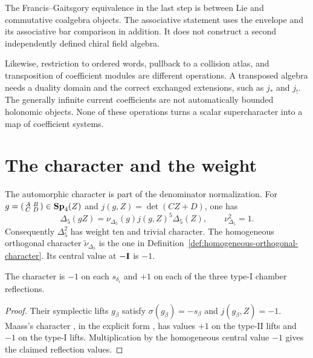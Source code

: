 The Francis--Gaitsgory equivalence in the last step is between Lie
and commutative coalgebra objects. The associative statement uses
the envelope and its associative bar comparison in addition.
It does not construct a second independently defined chiral field
algebra.

Likewise, restriction to ordered words, pullback to a
collision atlas, and transposition of coefficient modules are
different operations. A transposed algebra needs a duality domain
and the correct exchanged extensions, such as $j_*$ and $j_!$.
The generally infinite current coefficients are not automatically
bounded holonomic objects. None of these operations turns a scalar
supercharacter into a map of coefficient systems.

\section{The character and the weight}
\label{sec:bkm-maass-multiplier}

The automorphic character is part of the denominator normalization.
For $g=\left(\begin{smallmatrix}A&B\\C&D\end{smallmatrix}\right)
\in\mathbf{Sp}_4(Z)$ and $j(g,Z)=\det(CZ+D)$, one has
\begin{equation}
\label{eq:bkm-delta5-transformation}
 \Delta_5(gZ)=\nu_{\Delta_5}(g)j(g,Z)^5\Delta_5(Z),
 \qquad \nu_{\Delta_5}^2=1.
\end{equation}
Consequently $\Delta_5^2$ has weight ten and trivial character.
The homogeneous orthogonal character
$\widetilde\nu_{\Delta_5}$ is the one in
Definition~\ref{def:homogeneous-orthogonal-character}. Its central
value at $-\mathbf{I}$ is $-1$.

\begin{lemma}
\label{lem:bkm-maass-reflection-values}
The character is $-1$ on each $s_{\delta_i}$ and $+1$ on each
of the three type-I chamber reflections.
\end{lemma}
\begin{proof}
Their symplectic lifts $g_\beta$ satisfy
$\sigma(g_\beta)=-s_\beta$ and $j(g_\beta,Z)=-1$.
Maass's character \cite{MAASS:1}, in the explicit form
\cite[(1.5), Propositions~2.1--2.2]{GN}, has values $+1$ on the
type-II lifts and $-1$ on the type-I lifts.
Multiplication by the homogeneous central value $-1$ gives the
claimed reflection values.
\end{proof}

